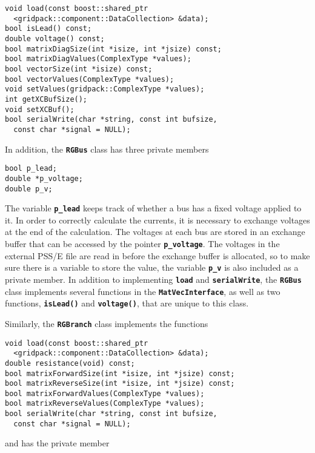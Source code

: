 {
\color{red}
\begin{Verbatim}[fontseries=b]
void load(const boost::shared_ptr
  <gridpack::component::DataCollection> &data);
bool isLead() const;
double voltage() const;
bool matrixDiagSize(int *isize, int *jsize) const;
bool matrixDiagValues(ComplexType *values);
bool vectorSize(int *isize) const;
bool vectorValues(ComplexType *values);
void setValues(gridpack::ComplexType *values);
int getXCBufSize();
void setXCBuf();
bool serialWrite(char *string, const int bufsize,
  const char *signal = NULL);
\end{Verbatim}
}

In addition, the \texttt{\textbf{RGBus}} class has three private members

{
\color{red}
\begin{Verbatim}[fontseries=b]
bool p_lead;
double *p_voltage;
double p_v;
\end{Verbatim}
}

The variable \texttt{\textbf{p\_lead}} keeps track of whether a bus has a fixed
voltage applied to it. In order to correctly calculate the currents, it is
necessary to exchange voltages at the end of the calculation. The voltages at
each bus are stored in an exchange buffer that can be accessed by the pointer
\texttt{\textbf{p\_voltage}}. The voltages in the external PSS/E file are read
in before the exchange buffer is allocated, so to make sure there is a variable
to store the value, the variable \texttt{\textbf{p\_v}} is also included as a
private member. In addition to implementing \texttt{\textbf{load}} and
\texttt{\textbf{serialWrite}}, the \texttt{\textbf{RGBus}} class implements
several functions in the \texttt{\textbf{MatVecInterface}}, as well as two
functions, \texttt{\textbf{isLead()}} and \texttt{\textbf{voltage()}}, that are unique to this class.

Similarly, the \texttt{\textbf{RGBranch}} class implements the functions

{
\color{red}
\begin{Verbatim}[fontseries=b]
void load(const boost::shared_ptr
  <gridpack::component::DataCollection> &data);
double resistance(void) const;
bool matrixForwardSize(int *isize, int *jsize) const;
bool matrixReverseSize(int *isize, int *jsize) const;
bool matrixForwardValues(ComplexType *values);
bool matrixReverseValues(ComplexType *values);
bool serialWrite(char *string, const int bufsize,
  const char *signal = NULL);
\end{Verbatim}
}

and has the private member

